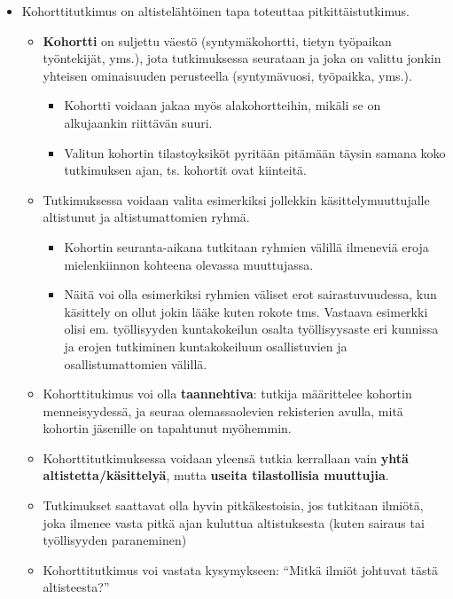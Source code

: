 \documentclass[
]{book}
\providecommand{\tightlist}{%
  \setlength{\itemsep}{0pt}\setlength{\parskip}{0pt}}
\begin{document}
\begin{itemize}
\tightlist
\item
  Kohorttitutkimus on altistelähtöinen tapa toteuttaa pitkittäistutkimus.

  \begin{itemize}
  \tightlist
  \item
    \textbf{Kohortti} on suljettu väestö (syntymäkohortti, tietyn työpaikan työntekijät, yms.), jota tutkimuksessa seurataan ja joka on valittu jonkin yhteisen ominaisuuden perusteella (syntymävuosi, työpaikka, yms.).

    \begin{itemize}
    \tightlist
    \item
      Kohortti voidaan jakaa myös alakohortteihin, mikäli se on alkujaankin riittävän suuri.
    \item
      Valitun kohortin tilastoyksiköt pyritään pitämään täysin samana koko tutkimuksen ajan, ts. kohortit ovat kiinteitä.
    \end{itemize}
  \item
    Tutkimuksessa voidaan valita esimerkiksi jollekkin käsittelymuuttujalle altistunut ja altistumattomien ryhmä.

    \begin{itemize}
    \tightlist
    \item
      Kohortin seuranta-aikana tutkitaan ryhmien välillä ilmeneviä eroja mielenkiinnon kohteena olevassa muuttujassa.
    \item
      Näitä voi olla esimerkiksi ryhmien väliset erot sairastuvuudessa, kun käsittely on ollut jokin lääke kuten rokote tms. Vastaava esimerkki olisi em. työllisyyden kuntakokeilun osalta työllisyysaste eri kunnissa ja erojen tutkiminen kuntakokeiluun osallistuvien ja osallistumattomien välillä.
    \end{itemize}
  \item
    Kohorttitukimus voi olla \textbf{taannehtiva}: tutkija määrittelee kohortin menneisyydessä, ja seuraa olemassaolevien rekisterien avulla, mitä kohortin jäsenille on tapahtunut myöhemmin.
  \item
    Kohorttitutkimuksessa voidaan yleensä tutkia kerrallaan vain \textbf{yhtä altistetta/käsittelyä}, mutta \textbf{useita tilastollisia muuttujia}.
  \item
    Tutkimukset saattavat olla hyvin pitkäkestoisia, jos tutkitaan ilmiötä, joka ilmenee vasta pitkä ajan kuluttua altistuksesta (kuten sairaus tai työllisyyden paraneminen)
  \item
    Kohorttitutkimus voi vastata kysymykseen: ``Mitkä ilmiöt johtuvat tästä altisteesta?''
  \end{itemize}
\end{itemize}
\end{document}
